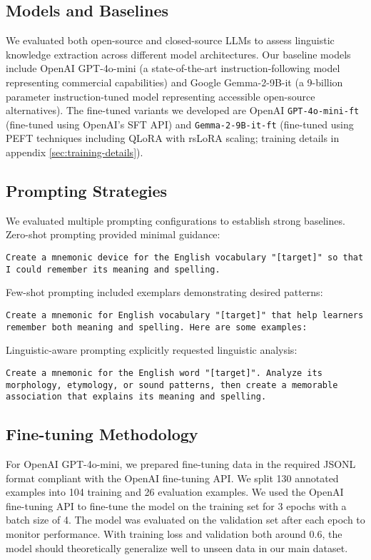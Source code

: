 \documentclass{article}
\newcounter{para}
\begin{document}
\subsection{Models and Baselines} \label{sec:models}
We evaluated both open-source and closed-source LLMs to assess linguistic knowledge extraction across different model architectures. Our baseline models include OpenAI GPT-4o-mini (a state-of-the-art instruction-following model representing commercial capabilities) and Google Gemma-2-9B-it (a 9-billion parameter instruction-tuned model representing accessible open-source alternatives). The fine-tuned variants we developed are OpenAI \verb|GPT-4o-mini-ft| (fine-tuned using OpenAI's SFT API) and \verb|Gemma-2-9B-it-ft| (fine-tuned using PEFT techniques including QLoRA with rsLoRA scaling; training details in appendix \ref{sec:training-details}).

\subsection{Prompting Strategies} \label{sec:prompting}
We evaluated multiple prompting configurations to establish strong baselines. Zero-shot prompting provided minimal guidance:

\texttt{Create a mnemonic device for the English vocabulary "[target]" so that I could remember its meaning and spelling.}

Few-shot prompting included exemplars demonstrating desired patterns:

\texttt{Create a mnemonic for English vocabulary "[target]" that help learners remember both meaning and spelling. Here are some examples:}

Linguistic-aware prompting explicitly requested linguistic analysis:

\texttt{Create a mnemonic for the English word "[target]". Analyze its morphology, etymology, or sound patterns, then create a memorable association that explains its meaning and spelling.}

\subsection{Fine-tuning Methodology} \label{sec:ft-methodology}
For OpenAI GPT-4o-mini, we prepared fine-tuning data in the required JSONL format compliant with the OpenAI fine-tuning API. We split 130 annotated examples into 104 training and 26 evaluation examples. We used the OpenAI fine-tuning API to fine-tune the model on the training set for 3 epochs with a batch size of 4. The model was evaluated on the validation set after each epoch to monitor performance. With training loss and validation both around 0.6, the model should theoretically generalize well to unseen data in our main dataset.
\end{document}
